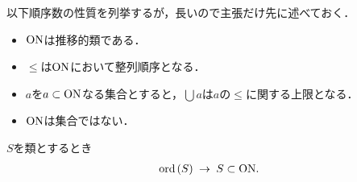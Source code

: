 	以下順序数の性質を列挙するが，長いので主張だけ先に述べておく．
	\begin{itemize}
		\item $\mathrm{ON}$は推移的類である．
		\item $\leq$は$\mathrm{ON}$において整列順序となる．
		\item $a$を$a \subset \mathrm{ON}$なる集合とすると，$\bigcup a$は$a$の$\leq$に関する上限となる．
		\item $\mathrm{ON}$は集合ではない．
	\end{itemize}
	
	\begin{screen}
		\begin{thm}
		\label{thm:transitive_totally_ordered_class_is_contained_in_ON}
			$S$を類とするとき
			\begin{align}
				\operatorname*{ord}\hspace{0.15em}(S) \hspace{0.25em}\rightarrow\hspace{0.25em} S \subset \mathrm{ON}.
			\end{align}
		\end{thm}
	\end{screen}
	

